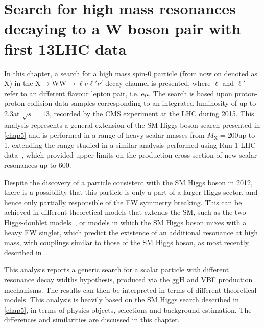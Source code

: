 \chapter[Search for high mass resonances decaying to a W boson pair with first \boldmath$13\TeV$ LHC data]{Search for high mass resonances decaying to a W boson pair with first 13\TeV LHC data}\label{chap6}
\thispagestyle{empty}

In this chapter, a search for a high mass spin-0 particle (from now on denoted as X) in the X$\rightarrow$WW$\rightarrow \ell\nu\ell'\nu'$ decay channel is presented, where $\ell$ and $\ell'$ refer to an different flavour lepton pair, i.e. e$\mu$. 
The search is based upon proton-proton collision data samples corresponding to an integrated luminosity
of up to 2.3\ifb  at $\sqrt{s} = 13$\TeV, recorded by the CMS experiment at the LHC during 2015. This analysis represents a general extension of the SM Higgs boson search presented in \ref{chap5} and is performed in a range of heavy scalar masses from $M_\mathrm{X} = 200$\GeV up to 1\TeV, extending the range studied in a similar analysis performed using Run 1 LHC data~\cite{Khachatryan:2015cwa}, which provided upper limits on the production cross section of new scalar resonances up to 600\GeV.

Despite the discovery of a particle consistent with the SM Higgs boson in 2012, there is a possibility that this particle is only a part of a larger Higgs sector, and hence only partially responsible of the EW symmetry breaking. This can be achieved in different theoretical models that extends the SM, such as the two-Higgs-doublet models~\cite{Branco:2011iw,craig,Haber:2015},
or models in which the SM Higgs boson mixes with a heavy EW singlet, which predict the existence
of an additional resonance at high mass, with couplings similar to those of the SM Higgs boson, as most recently described in~\cite{Chpoi:2013wga,Robens:2015gla}.

This analysis reports a generic search for a scalar particle with different resonance decay widths hypothesis, produced via the ggH and VBF production mechanisms. The results can then be interpreted in terms of different theoretical models. This analysis is heavily based on the SM Higgs search described in \ref{chap5}, in terms of physics objects, selections and background estimation. The differences and similarities are discussed in this chapter.

%






